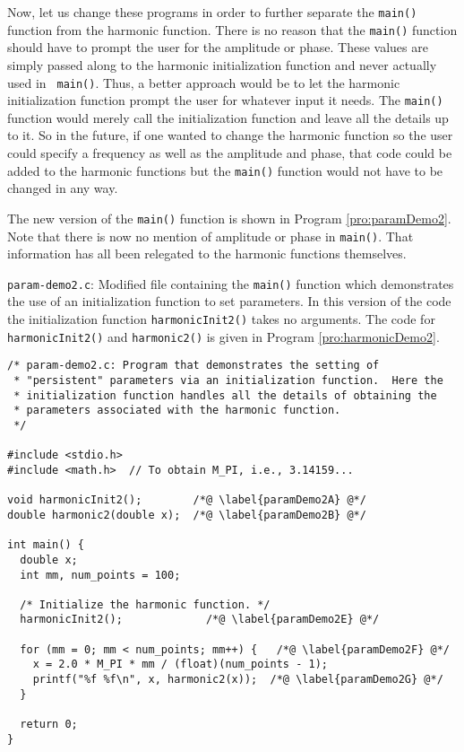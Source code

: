 Now, let us change these programs in order to further separate the
{\tt main()} function from the harmonic function.  There is no reason
that the {\tt main()} function should have to prompt the user for the
amplitude or phase.  These values are simply passed along to the
harmonic initialization function and never actually used in {\tt
  main()}.  Thus, a better approach would be to let the harmonic
initialization function prompt the user for whatever input it needs.
The {\tt main()} function would merely call the initialization
function and leave all the details up to it.  So in the future, if one
wanted to change the harmonic function so the user could specify a
frequency as well as the amplitude and phase, that code could be added
to the harmonic functions but the {\tt main()} function would not have
to be changed in any way.

The new version of the {\tt main()} function is shown in Program
\ref{pro:paramDemo2}.  Note that there is now no mention of amplitude
or phase in {\tt main()}.  That information has all been relegated to
the harmonic functions themselves.

\begin{program}
  {\tt param-demo2.c}: Modified file containing the {\tt main()}
  function which demonstrates the use of an initialization function to
  set parameters.  In this version of the code the initialization
  function {\tt harmonicInit2()} takes no arguments.  The code for
  {\tt harmonicInit2()} and {\tt harmonic2()} is given in Program
  \ref{pro:harmonicDemo2}.
\label{pro:paramDemo2}
\codemiddle
\begin{lstlisting}
/* param-demo2.c: Program that demonstrates the setting of
 * "persistent" parameters via an initialization function.  Here the
 * initialization function handles all the details of obtaining the
 * parameters associated with the harmonic function.
 */

#include <stdio.h>
#include <math.h>  // To obtain M_PI, i.e., 3.14159...

void harmonicInit2();        /*@ \label{paramDemo2A} @*/
double harmonic2(double x);  /*@ \label{paramDemo2B} @*/

int main() {
  double x;
  int mm, num_points = 100;

  /* Initialize the harmonic function. */
  harmonicInit2();             /*@ \label{paramDemo2E} @*/

  for (mm = 0; mm < num_points; mm++) {   /*@ \label{paramDemo2F} @*/
    x = 2.0 * M_PI * mm / (float)(num_points - 1);
    printf("%f %f\n", x, harmonic2(x));  /*@ \label{paramDemo2G} @*/
  }

  return 0;
}
\end{lstlisting}
\end{program}

